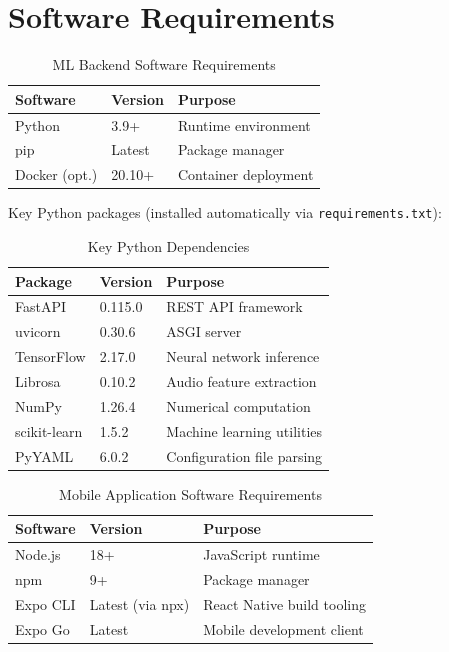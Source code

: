 \documentclass[10pt, a4paper, oneside]{report}
\begin{document}
\section{Software Requirements}
\label{sec:software}

\begin{table}[H]
\centering
\caption{ML Backend Software Requirements}
\label{tab:sw-backend}
\begin{tabularx}{\textwidth}{l l X}
  \toprule
  \textbf{Software} & \textbf{Version} & \textbf{Purpose} \\
  \midrule
  Python          & 3.9+    & Runtime environment \\
  pip             & Latest  & Package manager \\
  Docker (opt.)   & 20.10+  & Container deployment \\
  \bottomrule
\end{tabularx}
\end{table}

Key Python packages (installed automatically via \texttt{requirements.txt}):

\begin{table}[H]
\centering
\caption{Key Python Dependencies}
\label{tab:python-deps}
\begin{tabularx}{\textwidth}{l l X}
  \toprule
  \textbf{Package} & \textbf{Version} & \textbf{Purpose} \\
  \midrule
  FastAPI       & 0.115.0 & REST API framework \\
  uvicorn       & 0.30.6  & ASGI server \\
  TensorFlow    & 2.17.0  & Neural network inference \\
  Librosa       & 0.10.2  & Audio feature extraction \\
  NumPy         & 1.26.4  & Numerical computation \\
  scikit-learn  & 1.5.2   & Machine learning utilities \\
  PyYAML        & 6.0.2   & Configuration file parsing \\
  \bottomrule
\end{tabularx}
\end{table}

\begin{table}[H]
\centering
\caption{Mobile Application Software Requirements}
\label{tab:sw-mobile}
\begin{tabularx}{\textwidth}{l l X}
  \toprule
  \textbf{Software} & \textbf{Version} & \textbf{Purpose} \\
  \midrule
  Node.js   & 18+              & JavaScript runtime \\
  npm       & 9+               & Package manager \\
  Expo CLI  & Latest (via npx) & React Native build tooling \\
  Expo Go   & Latest           & Mobile development client \\
  \bottomrule
\end{tabularx}
\end{table}
\end{document}
